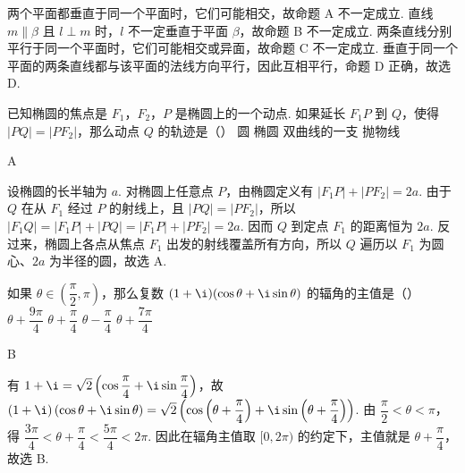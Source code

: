 \begin{solution}
两个平面都垂直于同一个平面时，它们可能相交，故命题 A 不一定成立. 直线 \(m\parallel\beta\) 且 \(l\perp m\) 时，\(l\) 不一定垂直于平面 \(\beta\)，故命题 B 不一定成立. 两条直线分别平行于同一个平面时，它们可能相交或异面，故命题 C 不一定成立. 垂直于同一个平面的两条直线都与该平面的法线方向平行，因此互相平行，命题 D 正确，故选 D.
\end{solution}

\begin{problem}
已知椭圆的焦点是 \(F_{1}\)，\(F_{2}\)，\(P\) 是椭圆上的一个动点. 如果延长 \(F_{1}P\) 到 \(Q\)，使得 \(\lvert PQ\rvert=\lvert PF_{2}\rvert\)，那么动点 \(Q\) 的轨迹是（\quad）
\choices
    {圆}
    {椭圆}
    {双曲线的一支}
    {抛物线}

\end{problem}

\begin{answer}
A
\end{answer}

\begin{solution}
设椭圆的长半轴为 \(a\). 对椭圆上任意点 \(P\)，由椭圆定义有 \(\lvert F_{1}P\rvert+\lvert PF_{2}\rvert=2a\). 由于 \(Q\) 在从 \(F_{1}\) 经过 \(P\) 的射线上，且 \(\lvert PQ\rvert=\lvert PF_{2}\rvert\)，所以
\(\lvert F_{1}Q\rvert=\lvert F_{1}P\rvert+\lvert PQ\rvert=\lvert F_{1}P\rvert+\lvert PF_{2}\rvert=2a\). 因而 \(Q\) 到定点 \(F_{1}\) 的距离恒为 \(2a\). 反过来，椭圆上各点从焦点 \(F_{1}\) 出发的射线覆盖所有方向，所以 \(Q\) 遍历以 \(F_{1}\) 为圆心、\(2a\) 为半径的圆，故选 A.
\end{solution}

\begin{problem}
如果 \(\theta\in\left(\dfrac{\pi}{2},\pi\right)\)，那么复数 \((1+\i)(\cos\theta+\i\sin\theta)\) 的辐角的主值是（\quad）
\choices
    {\(\theta+\dfrac{9\pi}{4}\)}
    {\(\theta+\dfrac{\pi}{4}\)}
    {\(\theta-\dfrac{\pi}{4}\)}
    {\(\theta+\dfrac{7\pi}{4}\)}
\end{problem}

\begin{answer}
B
\end{answer}

\begin{solution}
有 \(1+\i=\sqrt{2}\left(\cos\dfrac{\pi}{4}+\i\sin\dfrac{\pi}{4}\right)\)，故
\(\left(1+\i\right)\left(\cos\theta+\i\sin\theta\right)=\sqrt{2}\left(\cos\left(\theta+\dfrac{\pi}{4}\right)+\i\sin\left(\theta+\dfrac{\pi}{4}\right)\right)\). 由 \(\dfrac{\pi}{2}<\theta<\pi\)，得 \(\dfrac{3\pi}{4}<\theta+\dfrac{\pi}{4}<\dfrac{5\pi}{4}<2\pi\). 因此在辐角主值取 \([0,2\pi)\) 的约定下，主值就是 \(\theta+\dfrac{\pi}{4}\)，故选 B.
\end{solution}

